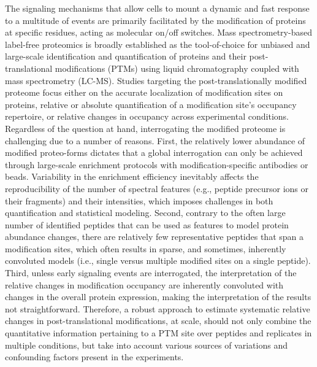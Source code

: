 \documentclass[mcp]{article}
\numberwithin{figure}{section} %
\numberwithin{table}{section}
\begin{document}
The signaling mechanisms that allow cells to mount a dynamic and fast response to a multitude of events are primarily facilitated by the modification of proteins at specific residues, acting as molecular on/off switches. Mass spectrometry-based label-free proteomics is broadly established as the tool-of-choice for unbiased and large-scale identification and quantification of proteins and their post-translational modifications (PTMs) using liquid chromatography coupled with mass spectrometry (LC-MS)\cite{Kall:2011ub}. Studies targeting the post-translationally modified proteome focus either on the accurate localization of modification sites on proteins, relative or absolute quantification of a modification site’s occupancy repertoire, or relative changes in occupancy across experimental conditions. Regardless of the question at hand, interrogating the modified proteome is challenging due to a number of reasons. First, the relatively lower abundance of modified proteo-forms dictates that a global interrogation can only be achieved through large-scale enrichment protocols with modification-specific antibodies or beads. Variability in the enrichment efficiency inevitably affects the reproducibility of the number of spectral features (e.g., peptide precursor ions or their fragments) and their intensities, which imposes challenges in both quantification and statistical modeling. Second, contrary to the often large number of identified peptides that can be used as features to model protein abundance changes, there are relatively few representative peptides that span a modification sites, which often results in sparse, and sometimes, inherently convoluted models (i.e., single versus multiple modified sites on a single peptide). Third, unless early signaling events are interrogated, the interpretation of the relative changes in modification occupancy are inherently convoluted with changes in the overall protein expression, making the interpretation of the results not straightforward. Therefore, a robust approach to estimate systematic relative changes in post-translational modifications, at scale, should not only combine the quantitative information pertaining to a PTM site over peptides and replicates in multiple conditions, but take into account various sources of variations and confounding factors present in the experiments. \cite{Olsen:2013}
\end{document}
